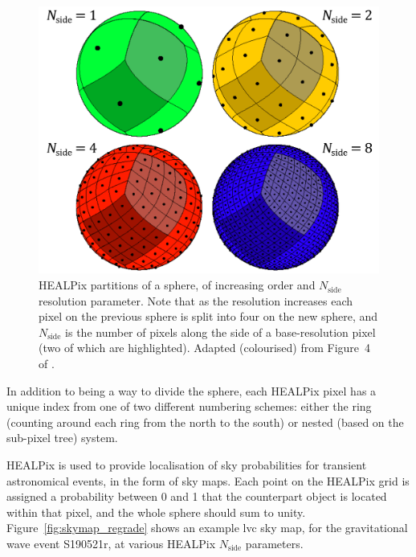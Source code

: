 \begin{colsection}
\begin{colsection}
\begin{figure}[t]
\begin{center}
\includegraphics[width=0.7\linewidth]{images/healpix.pdf}
\end{center}
\caption[HEALPix partitions of a sphere]{HEALPix partitions of a sphere, of increasing order and $N_\text{side}$ resolution parameter. Note that as the resolution increases each pixel on the previous sphere is split into four on the new sphere, and $N_\text{side}$ is the number of pixels along the side of a base-resolution pixel (two of which are highlighted). Adapted (colourised) from Figure~4 of \citet{HEALPix}.
}
\label{fig:healpix}
\end{figure}


In addition to being a way to divide the sphere, each HEALPix pixel has a unique index from one of two different numbering schemes: either the ring (counting around each ring from the north to the south) or nested (based on the sub-pixel tree) system.

HEALPix is used to provide localisation of sky probabilities for transient astronomical events, in the form of sky maps. Each point on the HEALPix grid is assigned a probability between 0 and 1 that the counterpart object is located within that pixel, and the whole sphere should sum to unity. Figure~\ref{fig:skymap_regrade} shows an example \gls{lvc} sky map, for the gravitational wave event S190521r, at various HEALPix $N_\text{side}$ parameters.


\begin{figure}[p]
\begin{center}

\begin{tabular}{cc}


\end{tabular}
\end{center}
\end{figure}
\end{colsection}
\end{colsection}
